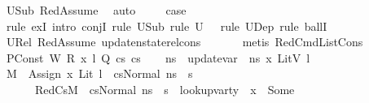 \begin{isabellebody}
\ U{}Sub\ RedAssume\ \isamarkupfalse%
\ auto\isanewline
\ \ \ \isamarkupfalse%
\ {\isacharquery}{\kern0pt}case\ \isanewline
\ \ \ \ \isamarkupfalse%
\ {\isacharparenleft}{\kern0pt}rule\ exI{\isacharcomma}{\kern0pt}\ intro\ conjI{\isacharcomma}{\kern0pt}\ rule\ U{}Sub{\isacharprime}{\kern0pt}{\isacharcomma}{\kern0pt}\ rule\ {\isacartoucheopen}U{}\ {\isasymnoteq}\ {\isacharbraceleft}{\kern0pt}{\isacharbraceright}{\kern0pt}{\isacartoucheclose}{\isacharcomma}{\kern0pt}\ rule\ U{}Dep{\isacharprime}{\kern0pt}{\isacharcomma}{\kern0pt}\ rule\ ballI{\isacharparenright}{\kern0pt}\isanewline
\ \ \ \ \ \isamarkupfalse%
\ U{}Rel\ RedAssume{}\ update{\isacharunderscore}{\kern0pt}nstate{\isacharunderscore}{\kern0pt}rel{\isacharunderscore}{\kern0pt}cons\isanewline
\ \ \ \ \ \isamarkupfalse%
\ {\isacharparenleft}{\kern0pt}metis\ RedCmdListCons{\isacharparenright}{\kern0pt}\isanewline
{}\isamarkupfalse%
\isanewline
\ \ \isamarkupfalse%
\ {\isacharparenleft}{\kern0pt}PConst\ W\ R\ x{}\ l\ Q\ cs{}\ cs{}{\isacharparenright}{\kern0pt}\isanewline
\ \ \isamarkupfalse%
\ {\isacharquery}{\kern0pt}ns{\isacharprime}{\kern0pt}\ {\isacharequal}{\kern0pt}\ {\isachardoublequoteopen}{\isacharparenleft}{\kern0pt}update{\isacharunderscore}{\kern0pt}var\ {\isasymLambda}\ ns\ x{}\ {\isacharparenleft}{\kern0pt}LitV\ l{\isacharparenright}{\kern0pt}{\isacharparenright}{\kern0pt}{\isachardoublequoteclose}\isanewline
\ \ \isamarkupfalse%
\ {\isacartoucheopen}M{\isacharcomma}{\kern0pt}{\isasymLambda}{\isacharcomma}{\kern0pt}{\isasymGamma}{\isacharcomma}{\kern0pt}{\isasymOmega}\ {\isasymturnstile}\ {\isasymlangle}Assign\ x{}\ {\isacharparenleft}{\kern0pt}Lit\ l{\isacharparenright}{\kern0pt}\ {\isacharhash}{\kern0pt}\ cs{}{\isacharcomma}{\kern0pt}Normal\ ns{\isasymrangle}\ {\isacharbrackleft}{\kern0pt}{\isasymrightarrow}{\isacharbrackright}{\kern0pt}\ s{\isacharprime}{\kern0pt}{\isacartoucheclose}\ \isamarkupfalse%
\ {\isasymtau}\ \isanewline
\ \ \ \ \ \ RedCs{}{\isacharcolon}{\kern0pt}{\isacartoucheopen}M{\isacharcomma}{\kern0pt}{\isasymLambda}{\isacharcomma}{\kern0pt}{\isasymGamma}{\isacharcomma}{\kern0pt}{\isasymOmega}\ {\isasymturnstile}\ {\isasymlangle}cs{}{\isacharcomma}{\kern0pt}Normal\ {\isacharquery}{\kern0pt}ns{\isacharprime}{\kern0pt}{\isasymrangle}\ {\isacharbrackleft}{\kern0pt}{\isasymrightarrow}{\isacharbrackright}{\kern0pt}\ s{\isacharprime}{\kern0pt}{\isacartoucheclose}\ \ {\isachardoublequoteopen}lookup{\isacharunderscore}{\kern0pt}var{\isacharunderscore}{\kern0pt}ty\ {\isasymLambda}\ x{}\ {\isacharequal}{\kern0pt}\ Some\ {\isasymtau}{\isachardoublequoteclose}\ \isanewline

\end{isabellebody}
